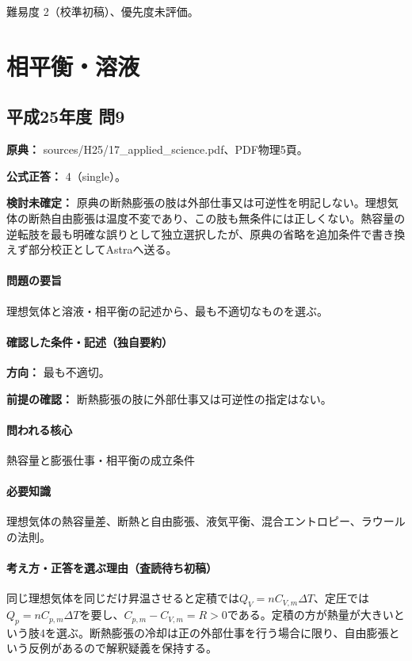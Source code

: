 \par 難易度 2（校準初稿）、優先度未評価。

\section{相平衡・溶液}

\subsection{平成25年度 問9}
\label{q:h25-reg-applied-09}

\noindent\textbf{原典：} sources/H25/17\_applied\_science.pdf、PDF物理5頁。

\textbf{公式正答：} 4（single）。

\par\textbf{検討未確定：} 原典の断熱膨張の肢は外部仕事又は可逆性を明記しない。理想気体の断熱自由膨張は温度不変であり、この肢も無条件には正しくない。熱容量の逆転肢を最も明確な誤りとして独立選択したが、原典の省略を追加条件で書き換えず部分校正としてAstraへ送る。

\paragraph{問題の要旨} 理想気体と溶液・相平衡の記述から、最も不適切なものを選ぶ。

\paragraph{確認した条件・記述（独自要約）}\mbox{}\par

\noindent\textbf{方向：} 最も不適切。\par

\noindent\textbf{前提の確認：} 断熱膨張の肢に外部仕事又は可逆性の指定はない。\par

\paragraph{問われる核心} 熱容量と膨張仕事・相平衡の成立条件

\paragraph{必要知識} 理想気体の熱容量差、断熱と自由膨張、液気平衡、混合エントロピー、ラウールの法則。

\paragraph{考え方・正答を選ぶ理由（査読待ち初稿）} 同じ理想気体を同じだけ昇温させると定積では\(Q_V=nC_{V,m}\Delta T\)、定圧では\(Q_p=nC_{p,m}\Delta T\)を要し、\(C_{p,m}-C_{V,m}=R>0\)である。定積の方が熱量が大きいという肢4を選ぶ。断熱膨張の冷却は正の外部仕事を行う場合に限り、自由膨張という反例があるので解釈疑義を保持する。

